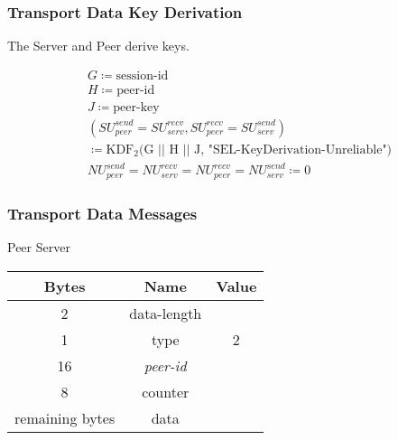 \subsubsection{Transport Data Key Derivation}

The Server and Peer derive keys.

\begin{align*}
    &  G\coloneqq \text{session-id}                                                               \\
    &  H \coloneqq \text{peer-id}                                                                \\
    &  J \coloneqq \text{peer-key}                                                              \\
    &  (\mathit{SU}_{peer}^{send} = \mathit{SU}_{serv}^{recv}, \mathit{SU}_{peer}^{recv} = \mathit{SU}_{serv}^{send})\\
    & \coloneqq \text{KDF}_2\text{(G || H || J, "SEL-KeyDerivation-Unreliable")} \\
    &   \mathit{NU}_{peer}^{send} = \mathit{NU}_{serv}^{recv} = \mathit{NU}_{peer}^{recv} = \mathit{NU}_{serv}^{send} \coloneqq 0
\end{align*}

\subsubsection{Transport Data Messages}

\begin{center}
    Peer \textrightarrow Server\\
    \begin{tabular}{|c|c|c|}
        \hline
        \textbf{Bytes}  & \textbf{Name}  & \textbf{Value} \\
        \hline
        2               & data-length    &                \\
        \hline
        1               & type           & 2              \\
        \hline
        16              & \emph{peer-id} &                \\
        \hline
        8               & counter        &                \\
        \hline
        remaining bytes & data           &                \\
        \hline
    \end{tabular}
\end{center}

